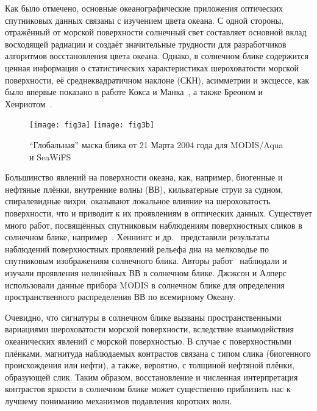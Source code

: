Как было отмечено, основные океанографические приложения оптических спутниковых данных связаны с изучением цвета океана. С одной стороны, отражённый от морской поверхности солнечный свет составляет основной вклад восходящей радиации и создаёт значительные трудности для разработчиков алгоритмов восстановления цвета океана. Однако, в солнечном блике содержится ценная информация о статистических характеристиках шероховатости морской поверхности, её среднеквадратичном наклоне (СКН), асимметрии и эксцессе, как было впервые показано в работе Кокса и Манка~\citep{Cox1954, Cox1954a}, а также Бреоном и Хенриотом~\citep{Breon2006}.



\begin{figure}[!thb]
	\centering
    \subcaptionbox{\label{fig:3a}}
    {\texttt{[image: fig3a]}}
    \subcaptionbox{\label{fig:3b}}
    {\texttt{[image: fig3b]}}
    \\
    \caption{``Глобальная'' маска блика от 21 Марта 2004 года для MODIS/Aqua и SeaWiFS}
    \label{fig:3}
\end{figure}

Большинство явлений на поверхности океана, как, например, биогенные и нефтяные плёнки, внутренние волны (ВВ), кильватерные струи за судном, спиралевидные вихри, оказывают локальное влияние на шероховатость поверхности, что и приводит к их проявлениям в оптических данных. Существует много работ, посвящённых спутниковым наблюдениям поверхностных сликов в солнечном блике, например~\citep{Adamo2005, Chust2007, Hu2009}. Хеннингс и др.~\citep{Hennings1994} представили результаты наблюдений поверхностных проявлений рельефа дна на мелководье по спутниковым изображениям солнечного блика. Авторы работ~\citep{Apel1975, Artale1990, Mitnik2000} наблюдали и изучали проявления нелинейных ВВ в солнечном блике. Джэксон и Алперс~\citep{Jackson2010} использовали данные прибора MODIS в солнечном блике для определения пространственного распределения ВВ по всемирному Океану.

Очевидно, что сигнатуры в солнечном блике вызваны пространственными вариациями шероховатости морской поверхности, вследствие взаимодействия океанических явлений с морской поверхностью. В случае с поверхностными плёнками, магнитуда наблюдаемых контрастов связана с типом слика (биогенного происхождения или нефти), а также, вероятно, с толщиной нефтяной плёнки, образующей слик. Таким образом, восстановление и численная интерпретация контрастов яркости в солнечном блике может существенно приблизить нас к лучшему пониманию механизмов подавления коротких волн.

